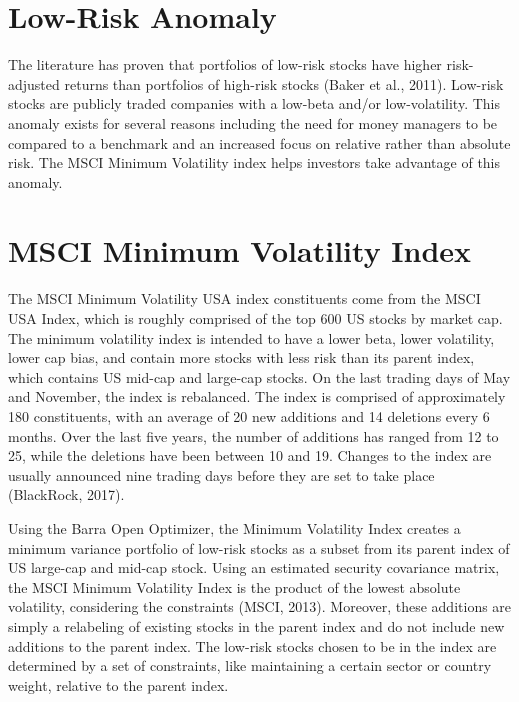 \documentclass[12pt,twoside]{reedthesis}
\theoremstyle{definition}
\theoremstyle{definition}
\theoremstyle{definition}
\theoremstyle{remark}
\begin{document}
\section{Low-Risk Anomaly}\label{low-risk-anomaly}

The literature has proven that portfolios of low-risk stocks have higher
risk-adjusted returns than portfolios of high-risk stocks (Baker et al.,
2011). Low-risk stocks are publicly traded companies with a low-beta
and/or low-volatility. This anomaly exists for several reasons including
the need for money managers to be compared to a benchmark and an
increased focus on relative rather than absolute risk. The MSCI Minimum
Volatility index helps investors take advantage of this anomaly.

\section{MSCI Minimum Volatility
Index}\label{msci-minimum-volatility-index}

The MSCI Minimum Volatility USA index constituents come from the MSCI
USA Index, which is roughly comprised of the top 600 US stocks by market
cap. The minimum volatility index is intended to have a lower beta,
lower volatility, lower cap bias, and contain more stocks with less risk
than its parent index, which contains US mid-cap and large-cap stocks.
On the last trading days of May and November, the index is rebalanced.
The index is comprised of approximately 180 constituents, with an
average of 20 new additions and 14 deletions every 6 months. Over the
last five years, the number of additions has ranged from 12 to 25, while
the deletions have been between 10 and 19. Changes to the index are
usually announced nine trading days before they are set to take place
(BlackRock, 2017).

Using the Barra Open Optimizer, the Minimum Volatility Index creates a
minimum variance portfolio of low-risk stocks as a subset from its
parent index of US large-cap and mid-cap stock. Using an estimated
security covariance matrix, the MSCI Minimum Volatility Index is the
product of the lowest absolute volatility, considering the constraints
(MSCI, 2013). Moreover, these additions are simply a relabeling of
existing stocks in the parent index and do not include new additions to
the parent index. The low-risk stocks chosen to be in the index are
determined by a set of constraints, like maintaining a certain sector or
country weight, relative to the parent index.
\end{document}
